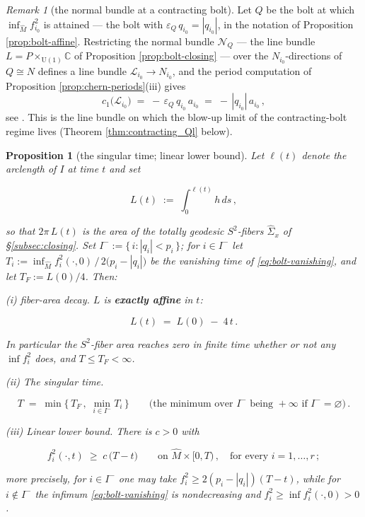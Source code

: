 \documentclass[11pt]{amsart}
\theoremstyle{plain}
\numberwithin{equation}{section}
\newtheorem{proposition}[theorem]{Proposition}
\theoremstyle{definition}
\theoremstyle{remark}
\newtheorem*{remarkx}{Remark}
\begin{document}
\begin{remarkx}[the normal bundle at a contracting bolt]
	Let $Q$ be the bolt at which $\inf_{\widehat{M}} f_{i_0}^2$ is attained --- the bolt with $\varepsilon_Q\, q_{i_0} = | q_{i_0} |$, in the notation of Proposition \ref{prop:bolt-affine}. Restricting the normal bundle $\mathcal{N}_Q$ --- the line bundle $L = P \times_{\mathrm{U}(1)} \mathbb{C}$ of Proposition \ref{prop:bolt-closing} --- over the $N_{i_0}$-directions of $Q \cong N$ defines a line bundle $\mathcal{L}_{i_0} \to N_{i_0}$, and the period computation of Proposition \ref{prop:chern-periods}(iii) gives
	\[
	c_1 \big( \mathcal{L}_{i_0} \big) \;=\; -\, \varepsilon_Q\, q_{i_0}\, a_{i_0} \;=\; -\, | q_{i_0} |\, a_{i_0} \,,
	\]
	see \cite{FT}. This is the line bundle on which the blow-up limit of the contracting-bolt regime lives (Theorem \ref{thm:contracting_Ql} below).
\end{remarkx}

\begin{proposition}[the singular time; linear lower bound]\label{prop:two-bolt-time}
	Let $\ell(t)$ denote the arclength of $I$ at time $t$ and set
	
	\[
	L(t) \;:=\; \int_0^{\ell(t)} h\, ds \,,
	\]
	
	so that $2 \pi\, L(t)$ is the area of the totally geodesic $S^2$-fibers $\widehat{\Sigma}_x$ of \S\ref{subsec:closing}. Set $I^- := \{\, i : | q_i | < p_i \,\}$; for $i \in I^-$ let $T_i := \inf_{\widehat{M}} f_i^2 (\cdot, 0) \,/\, 2 \big( p_i - | q_i | \big)$ be the vanishing time of \eqref{eq:bolt-vanishing}, and let $T_F := L(0) / 4$. Then:
	
	\emph{(i) fiber-area decay.} $L$ is \textbf{exactly affine} in $t$:
	
	\[
	L(t) \;=\; L(0) \;-\; 4\, t \,.
	\]
	
	In particular the $S^2$-fiber area reaches zero in finite time \emph{whether or not any} $\inf f_i^2$ \emph{does}, and $T \leq T_F < \infty$.
	
	\emph{(ii) The singular time.}
	
	\[
	T \;=\; \min \Big\{\, T_F \,, \; \min_{i \in I^-} T_i \,\Big\} \qquad \big( \text{the minimum over } I^- \text{ being } + \infty \text{ if } I^- = \varnothing \big) \,.
	\]
	
	\emph{(iii) Linear lower bound.} There is $c > 0$ with
	
	\begin{equation}\label{eq:two-bolt-lower}
		f_i^2 (\cdot, t) \;\geq\; c\, \big( T - t \big) \qquad \text{on } \widehat{M} \times [0, T) \,, \quad \text{for every } i = 1, \dots, r \,;
	\end{equation}
	
	more precisely, for $i \in I^-$ one may take $f_i^2 \geq 2 ( p_i - | q_i | ) ( T - t )$, while for $i \notin I^-$ the infimum \eqref{eq:bolt-vanishing} is nondecreasing and $f_i^2 \geq \inf f_i^2 (\cdot, 0) > 0$.
	
\end{proposition}
\end{document}
